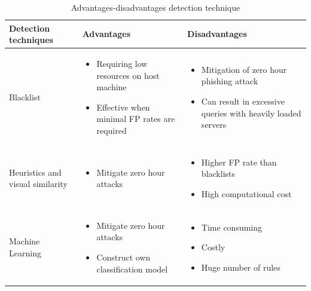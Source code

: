 \begin{table}
\begin{tabular}{>{\raggedright}p{2cm}>{\raggedright}p{4cm}>{\raggedright}p{4cm}}
\toprule 
\textbf{\footnotesize{}Detection techniques} & \textbf{\footnotesize{}Advantages} & \textbf{\footnotesize{}Disadvantages}\tabularnewline
\midrule 
{\scriptsize{}Blacklist} & \begin{itemize}
\item {\scriptsize{}Requiring low resources on host machine }{\scriptsize \par}
\item {\scriptsize{}Effective when minimal FP rates are required }\end{itemize}
 & \begin{itemize}
\item {\scriptsize{}Mitigation of zero hour phishing attack }{\scriptsize \par}
\item {\scriptsize{}Can result in excessive queries with heavily loaded
servers }\end{itemize}
\tabularnewline
\midrule 
{\scriptsize{}Heuristics and visual similarity} & \begin{itemize}
\item {\scriptsize{}Mitigate zero hour attacks}\end{itemize}
 & \begin{itemize}
\item {\scriptsize{}Higher FP rate than blacklists}{\scriptsize \par}
\item {\scriptsize{}High computational cost }\end{itemize}
\tabularnewline
\midrule 
{\scriptsize{}Machine Learning} & \begin{itemize}
\item {\scriptsize{}Mitigate zero hour attacks}{\scriptsize \par}
\item {\scriptsize{}Construct own classification model }\end{itemize}
 & \begin{itemize}
\item {\scriptsize{}Time consuming}{\scriptsize \par}
\item {\scriptsize{}Costly}{\scriptsize \par}
\item {\scriptsize{}Huge number of rules }\end{itemize}
\tabularnewline
\bottomrule
\end{tabular}\protect\caption{\label{tab:adv-dis}Advantages-disadvantages detection technique\citep{parmar:2014}}


\end{table}



